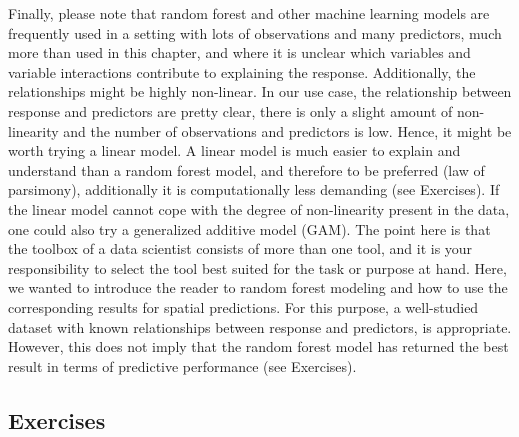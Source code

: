 \documentclass[]{krantz}
\begin{document}
Finally, please note that random forest and other machine learning models are frequently used in a setting with lots of observations and many predictors, much more than used in this chapter, and where it is unclear which variables and variable interactions contribute to explaining the response.
Additionally, the relationships might be highly non-linear.
In our use case, the relationship between response and predictors are pretty clear, there is only a slight amount of non-linearity and the number of observations and predictors is low.
Hence, it might be worth trying a linear model.
A linear model is much easier to explain and understand than a random forest model, and therefore to be preferred (law of parsimony), additionally it is computationally less demanding (see Exercises).
If the linear model cannot cope with the degree of non-linearity present in the data, one could also try a generalized additive model (GAM).
The point here is that the toolbox of a data scientist consists of more than one tool, and it is your responsibility to select the tool best suited for the task or purpose at hand.
Here, we wanted to introduce the reader to random forest modeling and how to use the corresponding results for spatial predictions.
For this purpose, a well-studied dataset with known relationships between response and predictors, is appropriate.
However, this does not imply that the random forest model has returned the best result in terms of predictive performance (see Exercises).

\hypertarget{exercises-10}{%
\subsection{Exercises}\label{exercises-10}}
\end{document}
